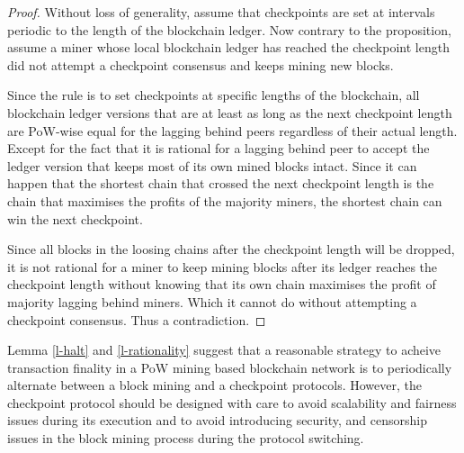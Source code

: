 \begin{proof}
Without loss of generality, assume that checkpoints are set at intervals periodic to the length of the blockchain ledger. Now contrary to the proposition, assume a miner whose local blockchain ledger has reached the checkpoint length did not attempt a checkpoint consensus and keeps mining new blocks. 

Since the rule is to set checkpoints at specific lengths of the blockchain, all blockchain ledger versions that are at least as long as the next checkpoint length are PoW-wise equal for the lagging behind peers regardless of their actual length. Except for the fact that it is rational for a lagging behind peer to accept the ledger version that keeps most of its own mined blocks intact. Since it can happen that the shortest chain that crossed the next checkpoint length is the chain that maximises the profits of the majority miners, the shortest chain can win the next checkpoint. 

Since all blocks in the loosing chains after the checkpoint length will be dropped, it is not rational for a miner to keep mining blocks after its ledger reaches the checkpoint length without knowing that its own chain maximises the profit of majority lagging behind miners. Which it cannot do without attempting a checkpoint consensus. Thus a contradiction. 
\end{proof}

Lemma \ref{l-halt} and \ref{l-rationality} suggest that a reasonable strategy to acheive transaction finality in a PoW mining based blockchain network is to periodically alternate between a block mining and a checkpoint protocols. However, the checkpoint protocol should be designed with care to avoid scalability and fairness issues during its execution and to avoid introducing security, and censorship issues in the block mining process during the protocol switching.     


